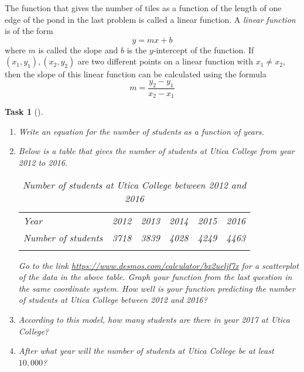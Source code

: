 \documentclass[10pt,]{article}
\theoremstyle{plain}
\newtheorem{proposition}[theorem]{Task}
\theoremstyle{definition}
\numberwithin{equation}{section}
\newcommand{\hrulemedium}{\noalign{\hrule height 0.07em}}
\begin{document}
\hypertarget{p-38}{}%
The function that gives the number of tiles as a function of the length of one edge of the pond in the last problem is called a linear function. A \emph{linear function} is of the form%
\begin{equation*}
y=mx+b
\end{equation*}
where \(m\) is called the slope and \(b\) is the \(y\)-intercept of the function. If \((x_1,y_1), (x_2,y_2)\) are two different points on a linear function with \(x_1 \neq x_2\), then the slope of this linear function can be calculated using the formula%
\begin{equation*}
m = \frac{y_2-y_1}{x_2-x_1}
\end{equation*}
%
\begin{proposition}[{}]\label{proposition-2}
\leavevmode%
\begin{enumerate}
\item\hypertarget{li-42}{}Write an equation for the number of students as a function of years.%
\item\hypertarget{li-43}{}Below is a table that gives the number of students at Utica College from year 2012 to 2016. \leavevmode%
\begin{table}
\centering
\begin{tabular}{lc}\hrulemedium
Year&2012&2013&2014&2015&2016\tabularnewline\hrulemedium
Number of students&3718&3839&4028&4249&4463\tabularnewline\hrulemedium
\end{tabular}
\caption{Number of students at Utica College between 2012 and 2016\label{table-1}}
\end{table}
 Go to the link \href{https://www.desmos.com/calculator/bx2ueljf7x}{https://www.desmos.com/calculator/bx2ueljf7x} for a scatterplot of the data in the above table. Graph your function from the last question in the same coordinate system. How well is your function predicting the number of students at Utica College between 2012 and 2016?%
\item\hypertarget{li-44}{}According to this model, how many students are there in year 2017 at Utica College?%
\item\hypertarget{li-45}{}After what year will the number of students at Utica College be at least \(10,000\)?%
\end{enumerate}
\end{proposition}
\end{document}
